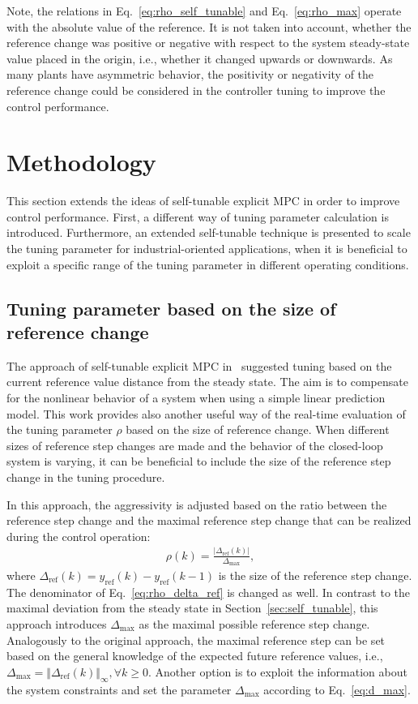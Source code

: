 \documentclass[preprint,12pt]{elsarticle}
\begin{document}
	Note, the relations in Eq.~\eqref{eq:rho_self_tunable} and Eq.~\eqref{eq:rho_max} operate with the absolute value of the reference. It is not taken into account, whether the reference change was positive or negative with respect to the system steady-state value placed in the origin, i.e., whether it changed upwards or downwards. As many plants have asymmetric behavior, the positivity or negativity of the reference change could be considered in the controller tuning to improve the control performance.
	
	
	\section{Methodology}
	\label{sec:methodology}
	This section extends the ideas of self-tunable explicit MPC in order to improve control performance. First, a different way of tuning parameter calculation is introduced. Furthermore, an extended self-tunable technique is presented to scale the tuning parameter for industrial-oriented applications, when it is beneficial to exploit a specific range of the tuning parameter in different operating conditions. 
	
	
	\subsection{Tuning parameter based on the size of reference change}
	\label{sec:self_tunable_delta_ref}
	The approach of self-tunable explicit MPC in~\cite{self_tunable} suggested tuning based on the current reference value distance from the steady state. The aim is to compensate for the nonlinear behavior of a system when using a simple linear prediction model. This work provides also another useful way of the real-time evaluation of the tuning parameter $\rho$ based on the size of reference change. When different sizes of reference step changes are made and the behavior of the closed-loop system is varying, it can be beneficial to include the size of the reference step change in the tuning procedure.
	
	In this approach, the aggressivity is adjusted based on the ratio between the reference step change and the maximal reference step change that can be realized during the control operation:
	\begin{eqnarray}
		\label{eq:rho_delta_ref}
		\rho(k) = \frac{\vert \Delta_{\mathrm{ref}}(k) \vert}{\Delta_{\max}},
	\end{eqnarray} 
	where $\Delta_{\mathrm{ref}}(k) = y_{\mathrm{ref}}(k) - y_{\mathrm{ref}}(k-1)$ is the size of the reference step change. The denominator of Eq.~\eqref{eq:rho_delta_ref} is changed as well. In contrast to the maximal deviation from the steady state in Section~\ref{sec:self_tunable}, this approach introduces $\Delta_{\max}$ as the maximal possible reference step change. Analogously to the original approach, the maximal reference step can be set based on the general knowledge of the expected future reference values, i.e., $\Delta_{\max} = \Vert \Delta_{\mathrm{ref}}(k) \Vert_{\infty}, \forall k \ge 0 $. 
	Another option is to exploit the information about the system constraints and set the parameter $\Delta_{\max}$ according to Eq.~\eqref{eq:d_max}. 
	
\end{document}
